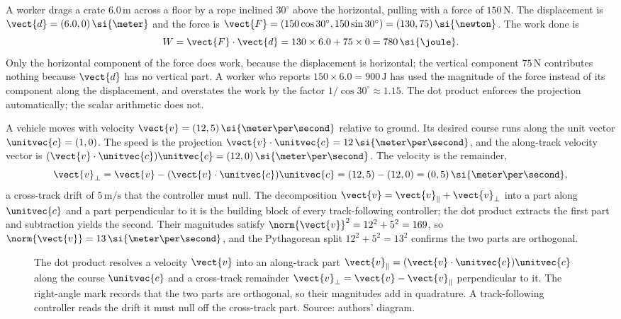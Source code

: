 \begin{example}
A worker drags a crate $6.0\,\si{\meter}$ across a floor by a rope
inclined $30^{\circ}$ above the horizontal, pulling with a force of
$150\,\si{\newton}$. The displacement is $\vect{d} = (6.0, 0)\,
\si{\meter}$ and the force is $\vect{F} = (150\cos 30^{\circ},
150\sin 30^{\circ}) = (130, 75)\,\si{\newton}$. The work done is
\[
W = \vect{F}\cdot\vect{d} = 130 \times 6.0 + 75 \times 0 = 780\,
\si{\joule}.
\]
Only the horizontal component of the force does work, because the
displacement is horizontal; the vertical component
$75\,\si{\newton}$ contributes nothing because $\vect{d}$ has no
vertical part. A worker who reports $150 \times 6.0 = 900\,\si{\joule}$
has used the magnitude of the force instead of its component along the
displacement, and overstates the work by the factor
$1/\cos 30^{\circ} \approx 1.15$. The dot product enforces the
projection automatically; the scalar arithmetic does not.
\end{example}

\begin{example}
A vehicle moves with velocity $\vect{v} = (12, 5)\,\si{\meter\per
\second}$ relative to ground. Its desired course runs along the unit
vector $\unitvec{c} = (1, 0)$. The  speed is the
projection $\vect{v}\cdot\unitvec{c} = 12\,\si{\meter\per\second}$,
and the along-track velocity vector is $(\vect{v}\cdot\unitvec{c})
\unitvec{c} = (12, 0)\,\si{\meter\per\second}$. The
 velocity is the remainder,
\[
\vect{v}_{\perp} = \vect{v} - (\vect{v}\cdot\unitvec{c})\unitvec{c}
= (12, 5) - (12, 0) = (0, 5)\,\si{\meter\per\second},
\]
a cross-track drift of $5\,\si{\meter\per\second}$ that the
controller must null. The decomposition $\vect{v} = \vect{v}_{\parallel}
+ \vect{v}_{\perp}$ into a part along $\unitvec{c}$ and a part
perpendicular to it is the building block of every track-following
controller; the dot product extracts the first part and subtraction
yields the second. Their magnitudes satisfy
$\norm{\vect{v}}^{2} = 12^{2} + 5^{2} = 169$, so $\norm{\vect{v}} =
13\,\si{\meter\per\second}$, and the Pythagorean split $12^{2} +
5^{2} = 13^{2}$ confirms the two parts are orthogonal.
\end{example}

\begin{figure}[h]
  \centering
  
  \caption[Projection of a velocity onto a course direction.]{The dot
  product resolves a velocity $\vect{v}$ into an along-track part
  $\vect{v}_{\parallel} = (\vect{v}\cdot\unitvec{c})\unitvec{c}$ along
  the course $\unitvec{c}$ and a cross-track remainder
  $\vect{v}_{\perp} = \vect{v} - \vect{v}_{\parallel}$ perpendicular to
  it. The right-angle mark records that the two parts are orthogonal,
  so their magnitudes add in quadrature. A track-following controller
  reads the drift it must null off the cross-track part. Source:
  authors' diagram.}
  \label{fig:vol02:ch08:projection-decomposition}
\end{figure}

